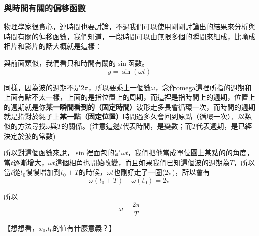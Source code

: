 \subsubsection{與時間有關的偏移函數}
物理學家很貪心，連時間也要討論，不過我們可以使用剛剛討論出的結果來分析與時間有關的偏移函數，我們知道，一段時間可以由無限多個的瞬間來組成，比喻成相片和影片的話大概就是這樣：

與前面類似，我們看只和時間有關的$\sin$函數。
$$ y = \sin (\omega t) $$

同樣，因為波的週期不是$2\pi$，所以要乘上一個數$\omega$，念作omega這裡所指的週期和上面有點不太一樣，上面的是指位置上的周期，而這裡是指時間上的週期，位置上的週期就是你\textbf{某一瞬間看到的（固定時間）}波形走多長會循環一次，而時間的週期就是指對於繩子上\textbf{某一點（固定位置）}時間過多久會回到原點（循環一次），以類似的方法尋找$ω$與$T$的關係。(注意這邊$t$代表時間，是變數；而$T$代表週期，是已經決定於波的常數)

所以對這個函數來說，$\sin$裡面包的是$\omega t$，我們把他當成單位圓上某點的的角度，當$t$逐漸增大，$\omega t$這個相角也開始改變，而且如果我們已知這個波的週期為$T$，所以當$t$從$t_0$慢慢增加到$t_0+T$的時候，$\omega t$也剛好走了一圈($2\pi$)，所以會有
$$
\omega\left(t_{0}+T\right)-\omega\left(t_{0}\right)=2 \pi
$$

所以
$$
\omega=\frac{2 \pi}{T}
$$

{\Kai 【想想看，$x_0$,$t_0$的值有什麼意義？】}

